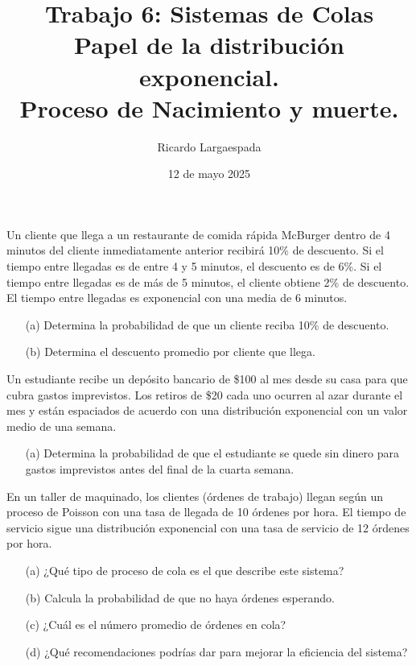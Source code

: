 \documentclass{article}
\title{Trabajo 6: Sistemas de Colas\\ Papel de la distribución exponencial.\\ 
Proceso de Nacimiento y muerte. }
\author{Ricardo Largaespada}
\date{12 de mayo 2025}
\begin{document}
\maketitle

\vspace{-.7cm}
\begin{problem}
Un cliente que llega a un restaurante de comida rápida McBurger dentro de 4 minutos del cliente inmediatamente anterior recibirá 10\% de descuento. Si el tiempo entre llegadas es de entre 4 y 5 minutos, el descuento es de 6\%. Si el tiempo entre llegadas es de más de 5 minutos, el cliente obtiene 2\% de descuento. El tiempo entre llegadas es exponencial con una media de 6 minutos.

\begin{itemize}
    \item [(a)] Determina la probabilidad de que un cliente reciba 10\% de descuento.
    \item [(b)] Determina el descuento promedio por cliente que llega.
\end{itemize}

\end{problem}

\begin{problem}
Un estudiante recibe un depósito bancario de \$100 al mes desde su casa para que cubra gastos imprevistos. Los retiros de \$20 cada uno ocurren al azar durante el mes y están espaciados de acuerdo con una distribución exponencial con un valor medio de una semana.

\begin{itemize}
    \item [(a)] Determina la probabilidad de que el estudiante se quede sin dinero para gastos imprevistos antes del final de la cuarta semana.
\end{itemize}
\end{problem}

\begin{problem}

En un taller de maquinado, los clientes (órdenes de trabajo) llegan según un proceso de Poisson con una tasa de llegada de 10 órdenes por hora. El tiempo de servicio sigue una distribución exponencial con una tasa de servicio de 12 órdenes por hora.

\begin{itemize}
    \item [(a)] ¿Qué tipo de proceso de cola es el que describe este sistema?
    \item [(b)] Calcula la probabilidad de que no haya órdenes esperando.
    \item [(c)] ¿Cuál es el número promedio de órdenes en cola?
    \item [(d)] ¿Qué recomendaciones podrías dar para mejorar la eficiencia del sistema?
\end{itemize}
\end{problem}
\end{document}
